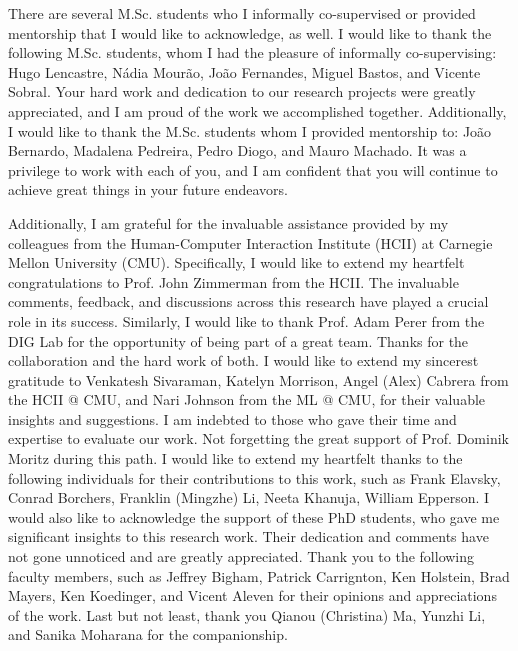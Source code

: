 There are several M.Sc. students who I informally co-supervised or provided mentorship that I would like to acknowledge, as well.
I would like to thank the following M.Sc. students, whom I had the pleasure of informally co-supervising: Hugo Lencastre, N\'{a}dia Mour\~{a}o, Jo\~{a}o Fernandes, Miguel Bastos, and Vicente Sobral.
Your hard work and dedication to our research projects were greatly appreciated, and I am proud of the work we accomplished together.
Additionally, I would like to thank the M.Sc. students whom I provided mentorship to: Jo\~{a}o Bernardo, Madalena Pedreira, Pedro Diogo, and Mauro Machado.
It was a privilege to work with each of you, and I am confident that you will continue to achieve great things in your future endeavors.

Additionally, I am grateful for the invaluable assistance provided by my colleagues from the Human-Computer Interaction Institute (HCII) at Carnegie Mellon University (CMU).
Specifically, I would like to extend my heartfelt congratulations to Prof. John Zimmerman from the HCII.
The invaluable comments, feedback, and discussions across this research have played a crucial role in its success.
Similarly, I would like to thank Prof. Adam Perer from the DIG Lab for the opportunity of being part of a great team.
Thanks for the collaboration and the hard work of both.
I would like to extend my sincerest gratitude to Venkatesh Sivaraman, Katelyn Morrison, Angel (Alex) Cabrera from the HCII @ CMU, and Nari Johnson from the ML @ CMU, for their valuable insights and suggestions.
I am indebted to those who gave their time and expertise to evaluate our work.
Not forgetting the great support of Prof. Dominik Moritz during this path.
I would like to extend my heartfelt thanks to the following individuals for their contributions to this work, such as Frank Elavsky, Conrad Borchers, Franklin (Mingzhe) Li, Neeta Khanuja, William Epperson.
I would also like to acknowledge the support of these PhD students, who gave me significant insights to this research work.
Their dedication and comments have not gone unnoticed and are greatly appreciated.
Thank you to the following faculty members, such as Jeffrey Bigham, Patrick Carrignton, Ken Holstein, Brad Mayers, Ken Koedinger, and Vicent Aleven for their opinions and appreciations of the work.
Last but not least, thank you Qianou (Christina) Ma, Yunzhi Li, and Sanika Moharana for the companionship.